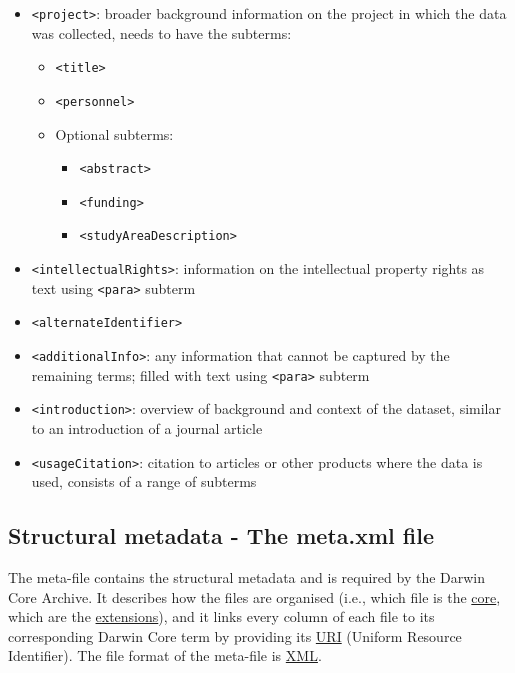 \documentclass[
]{book}
\providecommand{\tightlist}{%
  \setlength{\itemsep}{0pt}\setlength{\parskip}{0pt}}
\begin{document}
\begin{itemize}
\item
  {\texttt{\textless{}project\textgreater{}}}: broader background information on the project in which the data was collected, needs to have the subterms:

  \begin{itemize}
  \tightlist
  \item
    \texttt{\textless{}title\textgreater{}}
  \item
    \texttt{\textless{}personnel\textgreater{}}
  \item
    Optional subterms:

    \begin{itemize}
    \tightlist
    \item
      \texttt{\textless{}abstract\textgreater{}}
    \item
      \texttt{\textless{}funding\textgreater{}}
    \item
      \texttt{\textless{}studyAreaDescription\textgreater{}}
    \end{itemize}
  \end{itemize}
\item
  {\texttt{\textless{}intellectualRights\textgreater{}}}: information on the intellectual property rights as text using \texttt{\textless{}para\textgreater{}} subterm
\item
  {\texttt{\textless{}alternateIdentifier\textgreater{}}}
\item
  {\texttt{\textless{}additionalInfo\textgreater{}}}: any information that cannot be captured by the remaining terms; filled with text using \texttt{\textless{}para\textgreater{}} subterm
\item
  {\texttt{\textless{}introduction\textgreater{}}}: overview of background and context of the dataset, similar to an introduction of a journal article
\item
  {\texttt{\textless{}usageCitation\textgreater{}}}: citation to articles or other products where the data is used, consists of a range of subterms
\end{itemize}

\hypertarget{structural-metadata}{%
\subsection{Structural metadata - The meta.xml file}\label{structural-metadata}}

The meta-file contains the structural metadata and is required by the Darwin Core Archive. It describes how the files are organised (i.e., which file is the \protect\hyperlink{core}{core}, which are the \protect\hyperlink{extension}{extensions}), and it links every column of each file to its corresponding Darwin Core term by providing its \protect\hyperlink{URI}{URI} (Uniform Resource Identifier). The file format of the meta-file is \protect\hyperlink{xml}{XML}.
\end{document}
